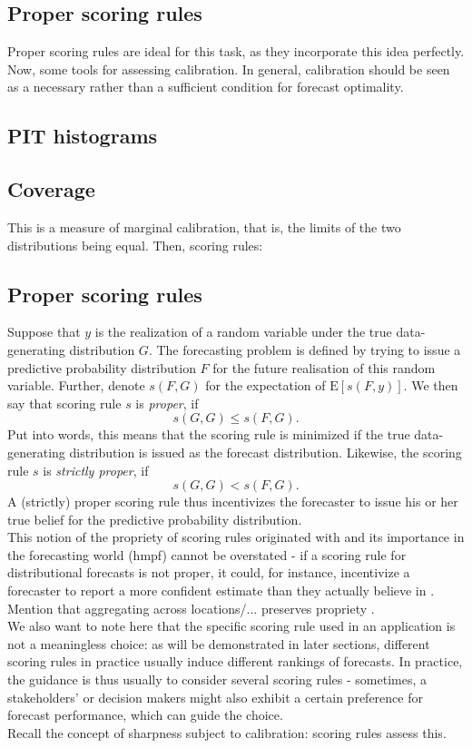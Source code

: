 \subsection{Proper scoring rules}
Proper scoring rules are ideal for this task, as they incorporate this idea perfectly.\\
Now, some tools for assessing calibration. In general, calibration should be seen as a necessary rather than a sufficient condition for forecast optimality.
\subsection{PIT histograms}
\subsection{Coverage}
This is a measure of marginal calibration, that is, the limits of the two distributions being equal.
Then, scoring rules:\\
\subsection{Proper scoring rules}
Suppose that $y$ is the realization of a random variable under the true data-generating distribution $G$. The forecasting problem is defined by trying to issue a predictive probability distribution $F$ for the future realisation of this random variable. Further, denote $s(F,G)$ for the expectation of $\text{E}[s(F,y)]$. We then say that scoring rule $s$ is \textit{proper}, if 
\[s(G,G) \leq s(F,G).\]
Put into words, this means that the scoring rule is minimized if the true data-generating distribution is issued as the forecast distribution. Likewise, the scoring rule $s$ is \textit{strictly proper}, if 
\[s(G,G) < s(F,G).\] 
A (strictly) proper scoring rule thus incentivizes the forecaster to issue his or her true belief for the predictive probability distribution.\\
This notion of the propriety of scoring rules originated with  and its importance in the forecasting world (hmpf) cannot be overstated - if a scoring rule for distributional forecasts is not proper, it could, for instance, incentivize a forecaster to report a more confident estimate than they actually believe in . \\
Mention that aggregating across locations/... preserves propriety \citep{bracher_evaluating_2021}.\\
We also want to note here that the specific scoring rule used in an application is not a meaningless choice: as will be demonstrated in later sections, different scoring rules in practice usually induce different rankings of forecasts. In practice, the guidance is thus usually to consider several scoring rules - sometimes, a stakeholders' or decision makers might also exhibit a certain preference for forecast performance, which can guide the choice.\\
Recall the concept of sharpness subject to calibration: scoring rules assess this.
